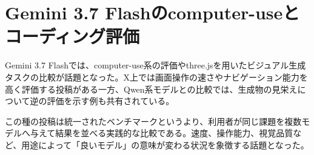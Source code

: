 \section{Gemini 3.7 Flashのcomputer-useとコーディング評価}

Gemini 3.7 Flashでは、computer-use系の評価やthree.jsを用いたビジュアル生成タスクの比較が話題となった。X上では画面操作の速さやナビゲーション能力を高く評価する投稿がある一方、Qwen系モデルとの比較では、生成物の見栄えについて逆の評価を示す例も共有されている。

この種の投稿は統一されたベンチマークというより、利用者が同じ課題を複数モデルへ与えて結果を並べる実践的な比較である。速度、操作能力、視覚品質など、用途によって「良いモデル」の意味が変わる状況を象徴する話題となった。
